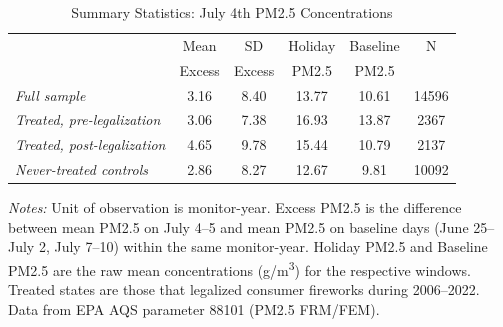 \begin{table}[H]
\centering
\caption{Summary Statistics: July 4th PM2.5 Concentrations}
\begin{threeparttable}
\begin{tabular}{l S[table-format=2.2] S[table-format=2.2] S[table-format=2.2] S[table-format=2.2] S[table-format=6.0]}
\toprule
& {Mean} & {SD} & {Holiday} & {Baseline} & {N} \\
& {Excess} & {Excess} & {PM2.5} & {PM2.5} & {} \\
\midrule
\textit{Full sample} & 3.16 & 8.40 & 13.77 & 10.61 & 14596 \\
\addlinespace
\textit{Treated, pre-legalization} & 3.06 & 7.38 & 16.93 & 13.87 & 2367 \\
\textit{Treated, post-legalization} & 4.65 & 9.78 & 15.44 & 10.79 & 2137 \\
\textit{Never-treated controls} & 2.86 & 8.27 & 12.67 & 9.81 & 10092 \\
\bottomrule
\end{tabular}
\begin{tablenotes}[flushleft]
\small
\item \textit{Notes:} Unit of observation is monitor-year. Excess PM2.5 is the difference between mean PM2.5 on July 4--5 and mean PM2.5 on baseline days (June 25--July 2, July 7--10) within the same monitor-year. Holiday PM2.5 and Baseline PM2.5 are the raw mean concentrations (\textmu g/m\textsuperscript{3}) for the respective windows. Treated states are those that legalized consumer fireworks during 2006--2022. Data from EPA AQS parameter 88101 (PM2.5 FRM/FEM).
\end{tablenotes}
\end{threeparttable}
\label{tab:summary}
\end{table}
